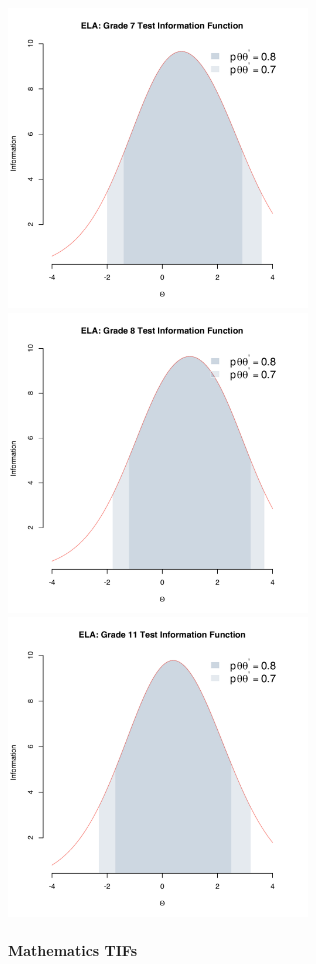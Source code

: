 \documentclass[]{article}
\let\oldparagraph\paragraph
\renewcommand{\paragraph}[1]{\oldparagraph{#1}\mbox{}}
\begin{document}
\includegraphics[width=\textwidth,height=3.125in]{tifs/ela7tif.pdf}
\includegraphics[width=\textwidth,height=3.125in]{tifs/ela8tif.pdf}
\includegraphics[width=\textwidth,height=3.125in]{tifs/ela11tif.pdf}
\newpage

\hypertarget{mathematics-tifs}{%
\paragraph{Mathematics TIFs}\label{mathematics-tifs}}
\end{document}
